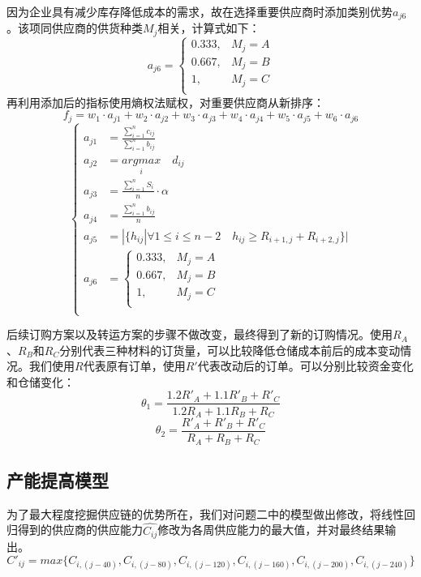 \documentclass{my_paper}
\begin{document}
因为企业具有减少库存降低成本的需求，故在选择重要供应商时添加类别优势$a_{j6}$。该项同供应商的供货种类$M_j$相关，计算式如下：
\begin{equation}
a_{j6} = \begin{cases}
    0.333 ,& M_j=A\\
        0.667 ,& M_j=B\\
        1 ,& M_j=C\\
\end{cases}
\label{aj6}
\end{equation}
再利用添加后的指标使用熵权法赋权，对重要供应商从新排序：
$$f_j = w_1\cdot a_{j1}+w_2\cdot a_{j2}+w_3\cdot a_{j3}+w_4\cdot a_{j4}+w_5\cdot a_{j5}+w_6\cdot a_{j6}$$
$$\begin{cases}
    a_{j1}&=\frac{\sum\limits^n_{i=1}c_{ij}}{\sum\limits^n_{i=1}b_{ij}}\\
    a_{j2}&=\underset{i}{argmax}\quad d_{ij}\\
    a_{j3}&=\frac{\sum\limits^n_{i=1} S_i}{n}\cdot \alpha\\
    a_{j4}&=\frac{\sum\limits^n_{i=1}b_{ij}}{n}\\
    a_{j5}& = |\{ h_{ij} |\forall 1\leq i \leq n-2 \quad h_{ij}\geq R_{i+1,j}+R_{i+2,j}\}|\\
    a_{j6} &= \begin{cases}
        0.333 ,& M_j=A\\
            0.667 ,& M_j=B\\
            1 ,& M_j=C\\
    \end{cases}\\
\end{cases}$$

后续订购方案以及转运方案的步骤不做改变，最终得到了新的订购情况。使用$R_A$、$R_B$和$R_C$分别代表三种材料的订货量，可以比较降低仓储成本前后的成本变动情况。我们使用$R$代表原有订单，使用$R'$代表改动后的订单。可以分别比较资金变化和仓储变化：
\begin{equation}
\theta_1=\frac{1.2R'_A+1.1R'_B+R'_C}{1.2R_A+1.1R_B+R_C}
\label{}
\end{equation}
\begin{equation}
    \theta_2=\frac{R'_A+R'_B+R'_C}{R_A+R_B+R_C}
    \label{}
    \end{equation}

\subsection{产能提高模型}
为了最大程度挖掘供应链的优势所在，我们对问题二中的模型做出修改，将线性回归得到的供应商的供应能力$\hat{C_{ij}}$修改为各周供应能力的最大值，并对最终结果输出。
\begin{equation}
C'_{ij} = max\{C_{i,(j-40)},C_{i,(j-80)},C_{i,(j-120)},C_{i,(j-160)},C_{i,(j-200)},C_{i,(j-240)}\}
\label{}
\end{equation}
\end{document}
